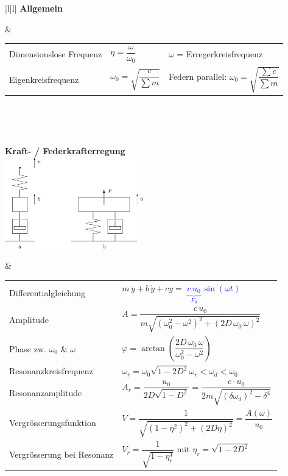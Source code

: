 \begin{tabular}{|l|l|}
\hline
\textbf{Allgemein}

	& \begin{minipage}[]{12cm}
      \renewcommand{\arraystretch}{2}      
		\begin{tabular}{lll}
    	Dimensionslose Frequenz
    		& $\eta=\dfrac{\omega}{\omega_0}$ 
			& $\omega$ = Erregerkreisfrequenz \\
    	Eigenkreisfrequenz
    		& $\omega_0 = \sqrt{\dfrac{c}{\sum m}}$
			& Federn parallel: $\omega_0 =
    		\sqrt{\dfrac{\sum c}{\sum m}}$
		\end{tabular} \\
    \end{minipage} \\
\hline
\hline
\parbox{6cm}{
	\textbf{Kraft- / Federkrafterregung}\\
	\includegraphics[width=6cm]{./bilder/federkrafterregung.png}}
	& \begin{minipage}[]{12cm}
      \renewcommand{\arraystretch}{2}      
		\begin{tabular}{ll}
    	Differentialgleichung
    		& $m \, \ddot{y} + b \, \dot{y} + c y=$
    		\textcolor{blue}{$\underbrace{c\,u_0}_{F_0} \, \sin(\omega t)$} \\
    	Amplitude
    		&
    		$A=\dfrac{c\,u_0}{m\sqrt{(\omega_0^2-\omega^2)^2+(2D\,\omega_0\,\omega)^2}}$ \\
    	Phase zw. $\omega_0$ \& $\omega$
    		&
    		$\varphi=\arctan\left(\dfrac{2D\,\omega_0\,\omega}{\omega_0^2-\omega^2}\right)$\\ 
    	Resonanzkreisfrequenz
    		& $\omega_r=\omega_0\sqrt{1-2D^2}$\quad $\omega_r<\omega_d<\omega_0$\\
    	Resonanzamplitude
    		& $A_r=\dfrac{u_0}{2D\sqrt{1-D^2}} = \dfrac{c \cdot u_0}{2m\sqrt{(\delta \omega_0)^2 - \delta^4}}$\\
    	Vergrösserungsfunktion
    		&
    		$V=\dfrac{1}{\sqrt{(1-\eta^2)^2+(2D\eta)^2}}=\dfrac{A(\omega)}{u_0}$ \\ 
    	Vergrösserung bei Resonanz
    		&
    		$V_r = \dfrac{1}{\sqrt{1-\eta_r^4}}$ mit $\eta_r = \sqrt{1-2D^2}$\\

\end{tabular}
\end{minipage}
\end{tabular}

